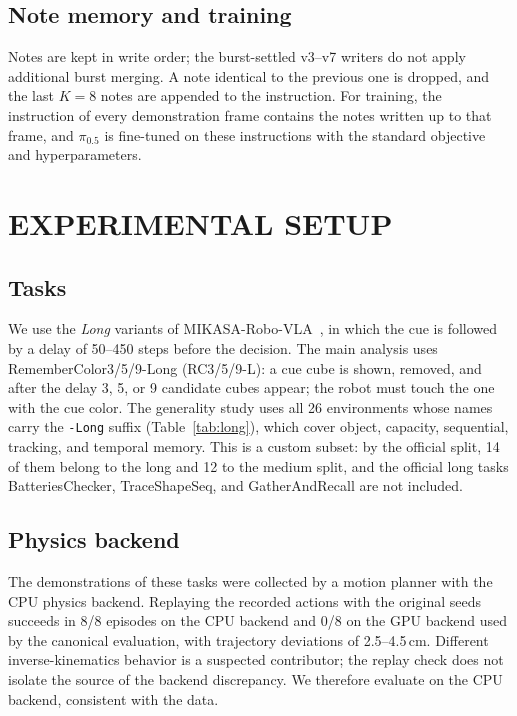 \documentclass{IJCAS}
\begin{document}
\subsection{Note memory and training}
Notes are kept in write order; the burst-settled v3--v7 writers do not apply additional burst merging. A note identical to the previous one is dropped, and the last $K=8$ notes are appended to the instruction.
For training, the instruction of every demonstration frame contains the notes written up to that frame, and $\pi_{0.5}$ is fine-tuned on these instructions with the standard objective and hyperparameters.

\section{EXPERIMENTAL SETUP}
\label{sec:setup}
\subsection{Tasks}
We use the \emph{Long} variants of MIKASA-Robo-VLA~\cite{mikasavla}, in which the cue is followed by a delay of 50--450 steps before the decision. The main analysis uses RememberColor3/5/9-Long (RC3/5/9-L): a cue cube is shown, removed, and after the delay 3, 5, or 9 candidate cubes appear; the robot must touch the one with the cue color. The generality study uses all 26 environments whose names carry the \texttt{-Long} suffix (Table~\ref{tab:long}), which cover object, capacity, sequential, tracking, and temporal memory. This is a custom subset: by the official split, 14 of them belong to the long and 12 to the medium split, and the official long tasks BatteriesChecker, TraceShapeSeq, and GatherAndRecall are not included.

\subsection{Physics backend}
The demonstrations of these tasks were collected by a motion planner with the CPU physics backend. Replaying the recorded actions with the original seeds succeeds in 8/8 episodes on the CPU backend and 0/8 on the GPU backend used by the canonical evaluation, with trajectory deviations of 2.5--4.5\,cm. Different inverse-kinematics behavior is a suspected contributor; the replay check does not isolate the source of the backend discrepancy. We therefore evaluate on the CPU backend, consistent with the data.
\end{document}
